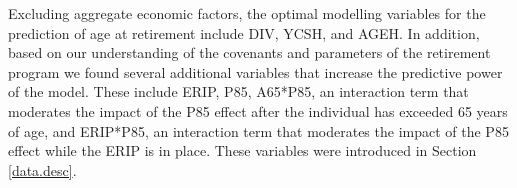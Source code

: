 \documentclass[12pt,letterpaper]{article}
\begin{document}



Excluding aggregate economic factors, the optimal modelling variables for the prediction of age at retirement include DIV, YCSH, and AGEH.  In addition, based on our understanding of the covenants and parameters of the retirement program we found several additional variables that increase the predictive power of the model. These include ERIP, P85, A65*P85, an interaction term that moderates the impact of the P85 effect after the individual has exceeded 65 years of age, and  ERIP*P85, an interaction term that moderates the impact of the P85 effect while the ERIP is in place.  These variables were introduced in Section \ref{data.desc}.
\end{document}
